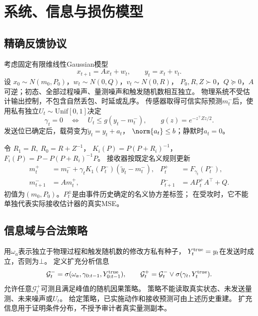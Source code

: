 \section{系统、信息与损伤模型}
\subsection{精确反馈协议}
考虑固定有限维线性Gaussian模型
\begin{equation}
x_{t+1}=Ax_t+w_t,\qquad y_t=x_t+v_t .
\label{eq:model}
\end{equation}
设 $x_0\sim N(m_0,P_0)$，$w_t\sim N(0,Q)$，$v_t\sim N(0,R)$，
$P_0,R,Z\succ0$，$Q\succeq0$，$A$可逆；初态、全部过程噪声、量测噪声和触发随机数相互独立。
物理系统不受估计输出控制，不包含自然丢包、时延或乱序。
传感器取得可信实际预测$m_t^-$后，使用私有独立$U_t\sim\mathrm{Unif}[0,1]$决定
\begin{equation}
\gamma_t=0\quad\Longleftrightarrow\quad
U_t\le g(y_t-m_t^-),\qquad g(z)=e^{-z^\top Zz/2}.
\label{eq:trigger}
\end{equation}
发送位已确定后，载荷变为$\tilde y_t=y_t+a_t$，
$\norm{a_t}\le b$；静默时$a_t=0$。

令 $R_1=R,\ R_0=R+Z^{-1}$，
$K_i(P)=P(P+R_i)^{-1}$，$F_i(P)=P-P(P+R_i)^{-1}P$。
接收器按既定名义规则更新
\begin{align}
m_t^+&=m_t^-+\gamma_tK_1(P_t^-)(\tilde y_t-m_t^-),&
P_t^+&=F_{\gamma_t}(P_t^-),\label{eq:receive}\\
m_{t+1}^-&=Am_t^+,& P_{t+1}^-&=AP_t^+A^\top+Q.\nonumber
\end{align}
初值为$(m_0,P_0)$。$P_t^\pm$是由事件历史确定的名义协方差标签；
在受攻时，它不能单独代表实际接收估计器的真实MSE。

\subsection{信息域与合法策略}
用$\omega_a$表示独立于物理过程和触发随机数的修改方私有种子，
$Y_t^{\rm true}=y_t$在发送时成立，否则为$\bot$。
定义扩充分析信息
\[
\mathcal G_t^-=\sigma(\omega_a,\gamma_{0:t-1},Y^{\rm true}_{0:t-1}),\qquad
\mathcal G_t^+=\mathcal G_t^-\vee\sigma(\gamma_t,Y_t^{\rm true}).
\]
允许任意$\mathcal G_t^+$可测且满足峰值的随机因果策略。
策略不能读取真实状态、未发送量测、未来噪声或$U_t$。
给定策略，已实施动作和接收预测可由上述历史重建。
扩充信息用于证明条件分布，不授予审计者真实量测副本。

